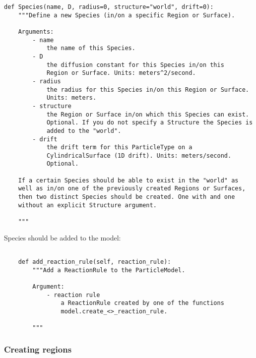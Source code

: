 \documentclass[a4paper,10pt]{article}
\begin{document}
\begin{verbatim}
def Species(name, D, radius=0, structure="world", drift=0):
    """Define a new Species (in/on a specific Region or Surface).

    Arguments:
        - name
            the name of this Species.
        - D
            the diffusion constant for this Species in/on this 
            Region or Surface. Units: meters^2/second.
        - radius
            the radius for this Species in/on this Region or Surface. 
            Units: meters.
        - structure
            the Region or Surface in/on which this Species can exist.  
            Optional. If you do not specify a Structure the Species is 
            added to the "world".
        - drift
            the drift term for this ParticleType on a 
            CylindricalSurface (1D drift). Units: meters/second. 
            Optional.

    If a certain Species should be able to exist in the "world" as 
    well as in/on one of the previously created Regions or Surfaces, 
    then two distinct Species should be created. One with and one 
    without an explicit Structure argument.

    """
\end{verbatim}

Species should be added to the model:
\begin{verbatim}

    def add_reaction_rule(self, reaction_rule):
        """Add a ReactionRule to the ParticleModel.

        Argument:
            - reaction rule
                a ReactionRule created by one of the functions
                model.create_<>_reaction_rule.

        """
\end{verbatim}

\subsubsection{Creating regions}
\end{document}
